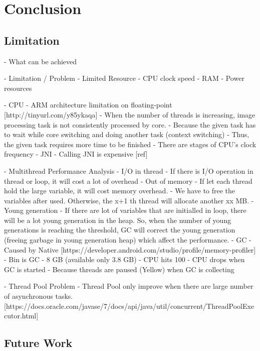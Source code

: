\chapter{Conclusion}\label{conclusion}

    \section{Limitation}
    - What can be achieved

    -	Limitation / Problem
            - Limited Resource
                - CPU clock speed
                - RAM
                - Power resources

            - CPU
                - ARM architecture limitation on floating-point [http://tinyurl.com/y85ykaqa]
                - When the number of threads is increasing, image processing task is not consistently processed by core.
                    - Because the given task has to wait while core switching and doing another task (context switching)
                    - Thus, the given task requires more time to be finished
                - There are stages of CPU's clock frequency
            - JNI
                - Calling JNI is expensive [ref]

            -	Multithread Performance Analysis
                - I/O in thread
                    - If there is I/O operation in thread or loop, it will cost a lot of overhead
                - Out of memory
                    - If let each thread hold the large variable, it will cost memory overhead.
                    - We have to free the variables after used. Otherwise, the x+1 th thread will allocate another xx MB.
                - Young generation
                    - If there are lot of variables that are initialled in loop, there will be a lot young generation in the heap. So, when the number of young generations is reaching the threshold, GC will correct the young generation (freeing garbage in young generation heap) which affect the performance.
                - GC
                    - Caused by Native [https://developer.android.com/studio/profile/memory-profiler]
                    - Bin is GC
                    - 8 GB (available only 3.8 GB)
                - CPU hits 100%
                - CPU drops when GC is started
                        - Because threads are paused (Yellow) when GC is collecting

            - Thread Pool Problem
                - Thread Pool only improve when there are large number of asynchronous tasks. [https://docs.oracle.com/javase/7/docs/api/java/util/concurrent/ThreadPoolExecutor.html]
    \section{Future Work}